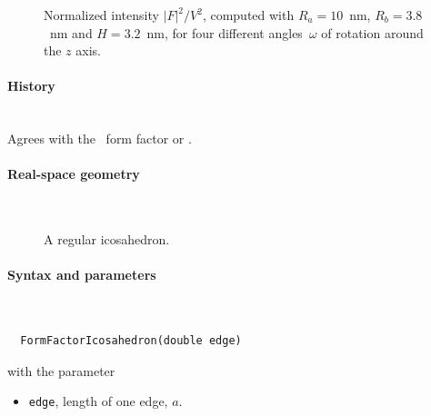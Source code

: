 \begin{figure}[H]
\begin{center}
\end{center}
\caption{Normalized intensity $|F|^2/V^2$,
computed with $R_a=10$~nm, $R_b=3.8$~nm and $H=3.2$~nm,
for four different angles~$\omega$ of rotation around the $z$ axis.}
\end{figure}

\paragraph{History}\strut\\
Agrees with the \IsGISAXS\ form factor
\cite[Eq.~2.42, with wrong sign in the $z$-dependent phase factor]{Laz08}
or  \cite[Eq.~229]{ReLL09}.


 \label{SIcosahedron}

\paragraph{Real-space geometry}\strut\\

\begin{figure}[H]
\strut\hfill
{}
\hfill\strut
\caption{A regular icosahedron.}
\end{figure}

\FloatBarrier

\paragraph{Syntax and parameters}\strut\\[-2ex plus .2ex minus .2ex]
\begin{lstlisting}
  FormFactorIcosahedron(double edge)
\end{lstlisting}
with the parameter
\begin{itemize}
\item \texttt{edge}, length of one edge, $a$.
\end{itemize}

